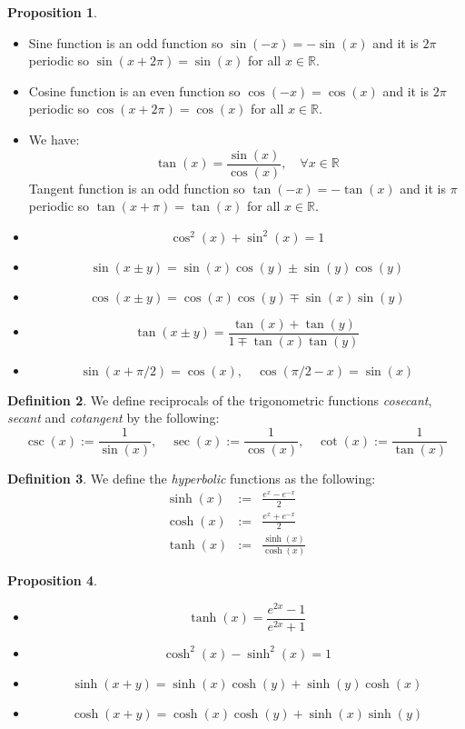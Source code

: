 \documentclass[11pt]{article}
\theoremstyle{definition}
\newtheorem{prop}{Proposition}[section]
\newtheorem{defn}[prop]{Definition}
\newcommand{\brac}[1]{\left(#1\right)}
\newcommand{\R}{\mathbb{R}}
\begin{document}
	\begin{prop}
		\begin{itemize}
			\item Sine function is an odd function so $\sin\brac{-x} = -\sin\brac{x}$ and it is $2\pi$ periodic so $\sin\brac{x+2\pi} = \sin\brac{x}$ for all $x\in \R$.
			\item Cosine function is an even function so $\cos\brac{-x} = \cos\brac{x}$ and it is $2\pi$ periodic so $\cos\brac{x+2\pi} = \cos\brac{x}$ for all $x\in \R$.
			\item We have:
			$$ \tan\brac{x} = \frac{\sin\brac{x}}{\cos\brac{x}}, \quad\forall x\in \R$$
			Tangent function is an odd function so $\tan\brac{-x} = -\tan\brac{x}$ and it is $\pi$ periodic so $\tan\brac{x+\pi} = \tan\brac{x}$ for all $x\in \R$.
			\item $$\cos^2\brac{x} + \sin^2\brac{x} = 1$$
			\item $$ \sin\brac{x\pm y} = \sin\brac{x}\cos\brac{y} \pm \sin\brac{y}\cos\brac{y}$$
			\item $$ \cos\brac{x\pm y} = \cos\brac{x}\cos\brac{y}\mp \sin\brac{x}\sin\brac{y}$$
			\item $$ \tan\brac{x\pm y} = \frac{\tan\brac{x}+\tan\brac{y}}{1\mp \tan\brac{x}\tan\brac{y}}$$
			\item $$\sin\brac{x+\pi/2} = \cos\brac{x}, \quad \cos\brac{\pi/2 - x} = \sin\brac{x}$$
		\end{itemize}
	\end{prop}
	\begin{defn}
		We define reciprocals of the trigonometric functions \emph{cosecant}, \emph{secant} and \emph{cotangent} by the following:
		$$ \csc\brac{x} := \frac{1}{\sin\brac{x}}, \quad \sec\brac{x} := \frac{1}{\cos\brac{x}}, \quad \cot\brac{x} := \frac{1}{\tan\brac{x}}$$
	\end{defn}
	\begin{defn}
		We define the \emph{hyperbolic} functions as the following:
		\begin{eqnarray*}
			\sinh\brac{x} &:=& \frac{e^{x}-e^{-x}}{2}\\
			\cosh\brac{x} &:=& \frac{e^{x}+e^{-x}}{2}\\
			\tanh\brac{x} &:=& \frac{\sinh\brac{x}}{\cosh\brac{x}}
		\end{eqnarray*}
	\end{defn}
	\begin{prop}
		\begin{itemize}
			\item $$\tanh\brac{x} = \frac{e^{2x}-1}{e^{2x}+1} $$
			\item $$ \cosh^2\brac{x} - \sinh^2\brac{x} = 1$$
			\item $$ \sinh\brac{x+y} = \sinh\brac{x}\cosh\brac{y} + \sinh\brac{y}\cosh\brac{x}$$
			\item $$\cosh\brac{x+y} = \cosh\brac{x}\cosh\brac{y} + \sinh\brac{x}\sinh\brac{y}$$
		\end{itemize}
	\end{prop}
\end{document}

